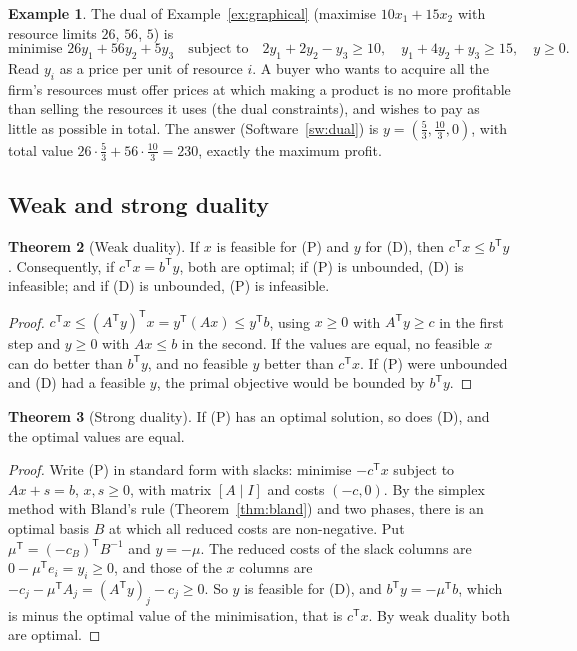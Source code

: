 \documentclass[11pt,a4paper]{article}
\numberwithin{equation}{section}
\theoremstyle{definition}
\newtheorem{thm}{Theorem}[subsection]
\newtheorem{exa}[thm]{Example}
\begin{document}
\begin{exa}
\label{ex:dualproductmix}
The dual of Example~\ref{ex:graphical} (maximise $10x_1 + 15x_2$ with resource limits $26$, $56$, $5$) is
\[
\text{minimise } 26y_1 + 56y_2 + 5y_3 \quad\text{subject to}\quad 2y_1 + 2y_2 - y_3 \geq 10, \quad y_1 + 4y_2 + y_3 \geq 15, \quad y \geq 0 .
\]
Read $y_i$ as a price per unit of resource $i$. A buyer who wants to acquire all the firm's resources must offer prices at which making a product is no more profitable than selling the resources it uses (the dual constraints), and wishes to pay as little as possible in total. The answer
(Software~\ref{sw:dual}) is $y = (\frac53, \frac{10}3, 0)$, with total value $26\cdot\frac53 + 56\cdot\frac{10}3 = 230$, exactly the maximum profit.
\end{exa}

\subsection{Weak and strong duality}
\label{ssec:strongduality}

\begin{thm}[Weak duality]
\label{thm:weakduality}
If $x$ is feasible for (P) and $y$ for (D), then $c^{\mathsf T}x \leq b^{\mathsf T}y$. Consequently, if $c^{\mathsf T}x = b^{\mathsf T}y$, both are optimal; if (P) is unbounded, (D) is infeasible; and if (D) is unbounded, (P) is infeasible.
\end{thm}

\begin{proof}
$c^{\mathsf T}x \leq (A^{\mathsf T}y)^{\mathsf T}x = y^{\mathsf T}(Ax) \leq y^{\mathsf T}b$, using $x \geq 0$ with $A^{\mathsf T}y \geq c$ in the first step and $y \geq 0$ with $Ax \leq b$ in the second. If the values are equal, no feasible $x$ can do better than $b^{\mathsf T}y$, and no feasible $y$ better than $c^{\mathsf T}x$.
If (P) were unbounded and (D) had a feasible $y$, the primal objective would be bounded by $b^{\mathsf T}y$.
\end{proof}

\begin{thm}[Strong duality]
\label{thm:strongduality}
If (P) has an optimal solution, so does (D), and the optimal values are equal.
\end{thm}

\begin{proof}
Write (P) in standard form with slacks: minimise $-c^{\mathsf T}x$ subject to $Ax + s = b$, $x, s \geq 0$, with matrix $[A \mid I]$ and costs $(-c, 0)$. By the simplex method with Bland's rule (Theorem~\ref{thm:bland}) and two phases, there is an optimal basis $B$ at which all reduced costs are non-negative. Put
$\mu^{\mathsf T} = (-c_B)^{\mathsf T}B^{-1}$ and $y = -\mu$. The reduced costs of the slack columns are $0 - \mu^{\mathsf T}e_i = y_i \geq 0$, and those of the $x$ columns are $-c_j - \mu^{\mathsf T}A_j = (A^{\mathsf T}y)_j - c_j \geq 0$. So $y$ is feasible for (D), and
$b^{\mathsf T}y = -\mu^{\mathsf T}b$, which is minus the optimal value of the minimisation, that is $c^{\mathsf T}x$. By weak duality both are optimal.
\end{proof}
\end{document}
